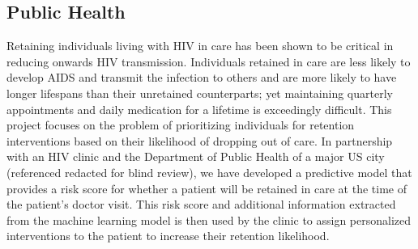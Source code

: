 









\subsection{Public Health}

Retaining individuals living with HIV in care has been shown to be critical in reducing onwards HIV transmission. Individuals retained in care are less likely to develop AIDS and transmit the infection to others and are more likely to have longer lifespans than their unretained counterparts; yet maintaining quarterly appointments and daily medication for a lifetime is exceedingly difficult. 
This project focuses on the problem of prioritizing individuals for retention interventions based on their likelihood of dropping out of care. In partnership with an HIV clinic and the Department of Public Health of a major US city (referenced redacted for blind review), we have developed a predictive model that provides a risk score for whether a patient will be retained in care at the time of the patient's doctor visit. This risk score and additional information extracted from the machine learning model is then used by the clinic to assign personalized interventions to the patient to increase their retention likelihood. 

